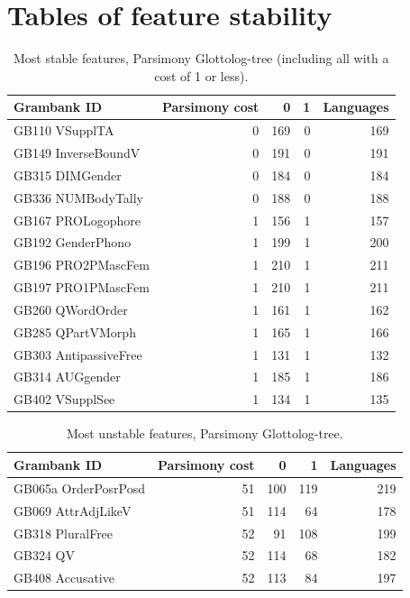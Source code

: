\documentclass[draft,10pt]{article} %
\begin{document}
\section{Tables of feature stability}
\label{stability_tables}
\singlespacing
\begin{table}[H]
\centering
\begin{tabular}{lrrrr}
  \hline
Grambank ID & Parsimony cost & 0 & 1 & Languages \\ 
  \hline
GB110 VSupplTA & 0 & 169 & 0 & 169 \\ 
  GB149 InverseBoundV & 0 & 191 & 0 & 191 \\ 
  GB315 DIMGender & 0 & 184 & 0 & 184 \\ 
  GB336 NUMBodyTally & 0 & 188 & 0 & 188 \\ 
  GB167 PROLogophore & 1 & 156 & 1 & 157 \\ 
  GB192 GenderPhono & 1 & 199 & 1 & 200 \\ 
  GB196 PRO2PMascFem & 1 & 210 & 1 & 211 \\ 
  GB197 PRO1PMascFem & 1 & 210 & 1 & 211 \\ 
  GB260 QWordOrder & 1 & 161 & 1 & 162 \\ 
  GB285 QPartVMorph & 1 & 165 & 1 & 166 \\ 
  GB303 AntipassiveFree & 1 & 131 & 1 & 132 \\ 
  GB314 AUGgender & 1 & 185 & 1 & 186 \\ 
  GB402 VSupplSee & 1 & 134 & 1 & 135 \\ 
   \hline
\end{tabular}
\caption{Most stable features, Parsimony Glottolog-tree (including all with a cost of 1 or less).} 
\label{stable_parsimony_glottolog}
\end{table}

\begin{table}[H]
\centering
\begin{tabular}{lrrrr}
  \hline
Grambank ID & Parsimony cost & 0 & 1 & Languages \\ 
  \hline
GB065a OrderPosrPosd & 51 & 100 & 119 & 219 \\ 
  GB069 AttrAdjLikeV & 51 & 114 & 64 & 178 \\ 
  GB318 PluralFree & 52 & 91 & 108 & 199 \\ 
  GB324 QV & 52 & 114 & 68 & 182 \\ 
  GB408 Accusative & 52 & 113 & 84 & 197 \\ 
   \hline
\end{tabular}
\caption{Most unstable features, Parsimony Glottolog-tree.} 
\label{unstable_parsimony_glottolog}
\end{table}
\end{document}
